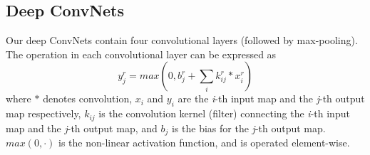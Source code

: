 \documentclass[10pt,twocolumn,letterpaper]{article}
\begin{document}
\subsection{\textbf{Deep ConvNets}}
Our deep ConvNets contain four convolutional layers (followed by max-pooling). The operation in each convolutional layer can be expressed as
\begin{equation}
y_j^r = max\left(0,b_j^r+\sum_i k_{ij}^r \ast x_i^r \right)
\end{equation}
where $\ast$ denotes convolution, $x_i$ and $y_i$ are the \emph{i}-th input map and the \emph{j}-th output map respectively, $k_{ij}$ is the convolution kernel (filter) connecting the \emph{i}-th input map and the \emph{j}-th output map, and $b_j$ is the bias for the \emph{j}-th output map. $max\left(0,\cdot\right)$ is the non-linear activation function, and is operated element-wise.

{\small


}

 
\end{document}
